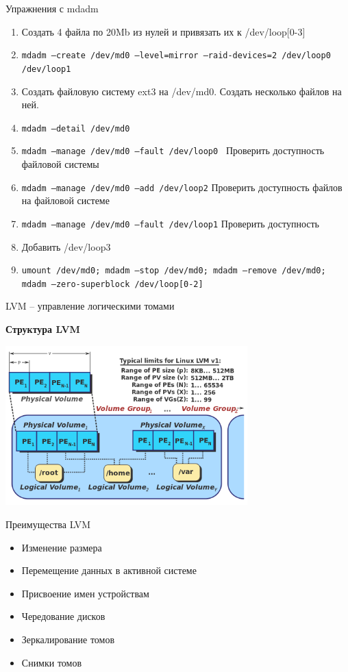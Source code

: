 \documentclass[ignorenonframetext, professionalfonts, hyperref={pdftex, unicode}]{beamer}
\begin{document}
\begin{frame}{Упражнения с mdadm}
    \begin{enumerate}
      \item Создать 4 файла по 20Mb из нулей и привязать их к /dev/loop[0-3]
      \item {\tt mdadm --create /dev/md0 --level=mirror --raid-devices=2 /dev/loop0 /dev/loop1}
      \item Создать файловую систему ext3 на /dev/md0. Создать несколько файлов на ней.
      \item {\tt mdadm --detail /dev/md0}
      \item {\tt mdadm --manage /dev/md0 --fault /dev/loop0 } Проверить доступность файловой системы
      \item {\tt mdadm --manage /dev/md0 --add /dev/loop2} Проверить доступность файлов на файловой системе
      \item {\tt mdadm --manage /dev/md0 --fault /dev/loop1} Проверить доступность
      \item Добавить /dev/loop3
      \item {\tt umount /dev/md0; mdadm --stop /dev/md0; mdadm --remove /dev/md0; mdadm --zero-superblock /dev/loop[0-2]}
    \end{enumerate}
\end{frame}

\begin{frame}{LVM -- управление логическими томами}
  \begin{center}
    \textbf{Структура LVM}
  \end{center}
  \includegraphics[width=0.7\textwidth]{LVM1-wiki.png}
\end{frame}

\begin{frame}{Преимущества LVM}
	\begin{itemize}
		\item Изменение размера
		\item Перемещение данных в активной системе
		\item Присвоение имен устройствам
		\item Чередование дисков
		\item Зеркалирование томов
		\item Снимки томов
	\end{itemize}
\end{frame}
 
\end{document}
